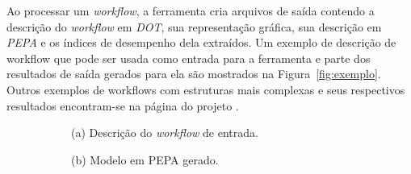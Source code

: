 \documentclass[a4paper,10pt]{article}
\begin{document}
	Ao processar um \emph{workflow}, a ferramenta cria arquivos de saída contendo a descrição do \emph{workflow} em \emph{DOT}, sua representação gráfica, sua descrição em \emph{PEPA} e os índices de desempenho dela extraídos. Um exemplo de descrição de workflow que pode ser usada como entrada para a ferramenta e parte dos resultados de saída gerados para ela são mostrados  na Figura~\ref{fig:exemplo}. Outros exemplos de workflows com estruturas mais complexas e seus respectivos resultados encontram-se na página do projeto \cite{web:script}.

\begin{figure}[h]
        \centering

        \begin{subfigure}[b]{0.6\textwidth}
                \footnotesize
                
                \normalsize
                (a) Descrição do \emph{workflow} de entrada.\\

                	\scriptsize
                
                \normalsize
                (b) Modelo em PEPA gerado.\\


\end{subfigure}
\end{figure}
\end{document}
